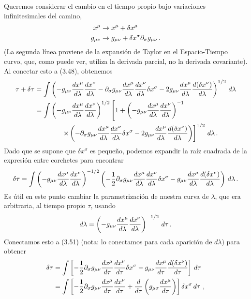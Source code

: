 \documentclass[11pt,b5paper,openany,twoside]{book}
\newcommand{\mn}{{\mu\nu}}
\newcommand{\p}[1]{{\partial_{#1}}}
\begin{document}
Queremos considerar el cambio en el tiempo propio bajo variaciones infinitesimales del camino,
\begin{align}
x^\mu &\rightarrow x^\mu+\delta x^\mu \notag \\
g_\mn &\rightarrow g_\mn + \delta x^\sigma\partial_\sigma g_\mn
\,. \label{3.49}
\end{align}
(La segunda línea proviene de la expansión de Taylor en el Espacio-Tiempo curvo, que, como puede ver, utiliza la derivada parcial, no la derivada covariante).
Al conectar esto a (3.48), obtenemos
\begin{align}
\tau + \delta\tau &=  \int\left(-g_\mn {{dx^\mu}\over{d\lambda}}
{{dx^\nu}\over{d\lambda}} - \p\sigma g_\mn {{dx^\mu}\over{d\lambda}}
{{dx^\nu}\over{d\lambda}}\delta x^\sigma
-2 g_\mn {{dx^\mu}\over{d\lambda}}{{d(\delta x^\nu)}\over{d\lambda}}
\right)^{1/2}\, d\lambda \notag \\
&=  \int\left(-g_\mn {{dx^\mu}\over{d\lambda}}
{{dx^\nu}\over{d\lambda}}\right)^{1/2}
\left[1+\left(-g_\mn {{dx^\mu}\over{d\lambda}}
{{dx^\nu}\over{d\lambda}}\right)^{-1}\right. \notag \\
& \qquad\qquad\left.
\times\left(-\p\sigma g_\mn {{dx^\mu}\over{d\lambda}}
{{dx^\nu}\over{d\lambda}}\delta x^\sigma
-2 g_\mn {{dx^\mu}\over{d\lambda}}{{d(\delta x^\nu)}\over{d\lambda}}
\right)\right]^{1/2}\, d\lambda\,. \label{3.50}
\end{align}
Dado que se supone que $\delta x^\sigma$ es pequeño, podemos expandir la raíz cuadrada de la expresión entre corchetes para encontrar
\begin{equation}
\delta\tau = \int\left(-g_\mn {{dx^\mu}\over{d\lambda}}
{{dx^\nu}\over{d\lambda}}\right)^{-1/2}
\left(-{1\over 2}\p\sigma g_\mn {{dx^\mu}\over{d\lambda}}
{{dx^\nu}\over{d\lambda}}\delta x^\sigma
- g_\mn {{dx^\mu}\over{d\lambda}}{{d(\delta x^\nu)}\over{d\lambda}}
\right)\, d\lambda\,.\label{3.51}
\end{equation}
Es útil en este punto cambiar la parametrización de nuestra curva de $\lambda$, que era arbitraria, al tiempo propio $\tau$, usando
\begin{equation}
d\lambda = \left(-g_\mn {{dx^\mu}\over{d\lambda}}
{{dx^\nu}\over{d\lambda}}\right)^{-1/2}\, d\tau\,.\label{3.52}
\end{equation}
Conectamos esto a (3.51) (nota: lo conectamos para cada aparición de $d\lambda$) para obtener
\begin{align}
\delta\tau &= \int \left[-{1\over 2}\p\sigma g_\mn
{{dx^\mu}\over{d\tau}} {{dx^\nu}\over{d\tau}}\delta x^\sigma
- g_\mn {{dx^\mu}\over{d\tau}}{{d(\delta x^\nu)}\over{d\tau}}
\right]\, d\tau \notag \\
&=  \int \left[-{1\over 2}\p\sigma g_\mn
{{dx^\mu}\over{d\tau}} {{dx^\nu}\over{d\tau}}
+{{d}\over{d\tau}}\left(g_{\mu\sigma} {{dx^\mu}\over{d\tau}}\right)
\right]\delta x^\sigma\, d\tau\ , \label{3.53}
\end{align}
\end{document}
